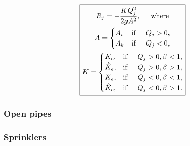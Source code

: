 \documentclass[12pt]{article}
\begin{document}
\begin{align}\label{abrupt_size_change_resistance}
\boxed{
  \!\begin{gathered}
  R_j = -\frac{K Q_j^2}{2 g A^2}, \hspace{0.5cm} \text{where} \\
A = \begin{cases}
A_i &\text{if} \hspace{0.5cm} Q_j > 0,\\
A_k &\text{if} \hspace{0.5cm} Q_j < 0,
\end{cases} \nonumber \\
K = \begin{cases} 
K_c, &\text{if} \hspace{0.5cm} Q_j > 0, \beta < 1, \\
\hat{K}_e, &\text{if} \hspace{0.5cm} Q_j > 0, \beta > 1, \\
K_e, &\text{if} \hspace{0.5cm} Q_j < 0, \beta < 1, \\
\hat{K}_c, &\text{if} \hspace{0.5cm} Q_j < 0, \beta > 1.
\end{cases} \nonumber
  \end{gathered}
}
\end{align}


\subsubsection{Open pipes}

\subsubsection{Sprinklers}
\end{document}
